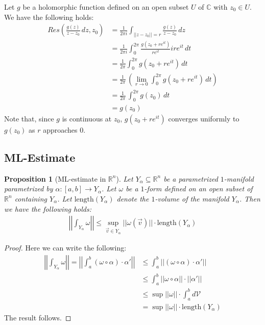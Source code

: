 \documentclass[11pt,oneside]{book}
\theoremstyle{break}
\theoremstyle{break}
\newtheorem{prop}[lem]{Proposition}
\newcommand{\R}{\mathbb{R}}
\newcommand{\Complex}{\mathbb{C}}
\begin{document}
Let $g$ be a holomorphic function defined on an open subset $U$ of $\Complex$ with $z_0 \in U$.\\ 
We have the following holds:
\begin{align*}
Res\left(\frac{g(z)}{z-z_0}\, dz, z_0\right) &= \frac{1}{2\pi i}\int_{||z-z_0||=r} \frac{g(z)}{z-z_0}\, dz \\
&=\frac{1}{2\pi i} \int_0^{2\pi} \frac{g(z_0+re^{it})}{re^{it}}ire^{it}\, dt \\
&=\frac{1}{2\pi}\int_0^{2\pi} g(z_0+re^{it})\, dt\\
&= \frac{1}{2\pi}\,\left(\lim_{r \to 0}\int_0^{2\pi} g(z_0+re^{it})\, dt\right)\\
&= \frac{1}{2\pi}\, \int_0^{2\pi} g(z_0)\, dt\\
&= g(z_0)
\end{align*}
Note that, since $g$ is continuous at $z_0$, $g(z_0+re^{it})$ converges uniformly to $g(z_0)$ as $r$ approaches $0$.\\


\newpage
\subsection*{ML-Estimate}


\begin{prop}[ML-estimate in $\R^n$]
Let $Y_\alpha \subseteq \R^n$ be a parametrized $1$-manifold parametrized by $\alpha:[a,b] \to Y_\alpha$. Let $\omega$ be a $1$-form defined on an open subset of $\R^n$ containing $Y_\alpha$. Let $\text{length}(Y_\alpha)$ denote the $1$-volume of the manifold $Y_\alpha$. Then we have the following holds:
\begin{align*}
\left|\left|\int_{Y_\alpha} \omega \right|\right| \leq \sup_{\vec{v}\in Y_\alpha}||\omega(\vec{v})|| \cdot \text{length}(Y_\alpha)
\end{align*}
\end{prop}
\begin{proof}
Here we can write the following:
\begin{align*}
\left|\left|\int_{Y_\alpha} \omega \right|\right|= \left|\left|\int_a^b (\omega\circ \alpha) \cdot \alpha' \right|\right|
&\leq \int_a^b ||(\omega\circ \alpha) \cdot \alpha'||\\
&\leq \int_a^b ||\omega\circ \alpha|| \cdot ||\alpha'||\\
&\leq \sup||\omega|| \cdot \int_a^b d\mathcal{V}\\
&= \sup||\omega|| \cdot \text{length}(Y_\alpha)
\end{align*}
The result follows.
\end{proof}
\end{document}
